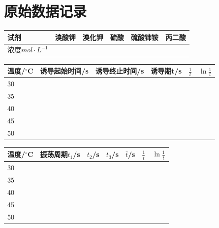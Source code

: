 \documentclass[a4paper]{article}
\begin{document}
\section{原始数据记录}
\begin{table}[!h]
	\begin{center}
		\begin{tabular}{l|l|l|l|l|l}
			\hline
			试剂&  溴酸钾&  溴化钾& 硫酸 & 硫酸铈铵 & 丙二酸\\
			\hline
			浓度$mol\cdot L^{-1}$&  &  &  &  &\\
			\hline
		 \end{tabular}
	\end{center}
\end{table}
\begin{table}[!h]
	\begin{center}
		\begin{tabular}{l|l|l|l|l|l}
			\hline
			温度/$^\circ$C&  诱导起始时间/s&  诱导终止时间/s& 诱导期t/s & $\frac{1}{t}$ & $\ln{\frac{1}{t}}$\\
			\hline
			30&  &  &  &  &\\
			\hline
			35&  &  &  &  &\\
			\hline
			40&  &  &  &  &\\
			\hline
			45&  &  &  &  &\\
			\hline
			50&  &  &  &  &\\
			\hline
		 \end{tabular}
	\end{center}
\end{table}
\begin{table}[!h]
	\begin{center}
		\begin{tabular}{l|l|l|l|l|l|l}
			\hline
			温度/$^\circ$C&  振荡周期$t_{1}$/s & $t_{2}$/s & $t_{3}$/s & $\bar{t}$/s & $\frac{1}{\bar{t}}$ & $\ln{\frac{1}{\bar{t}}}$\\
			\hline
			30&  &  &  &  &  &\\
			\hline
			35&  &  &  &  &  &\\
			\hline
			40&  &  &  &  &  &\\
			\hline
			45&  &  &  &  &  &\\
			\hline
			50&  &  &  &  &  &\\
			\hline
		 \end{tabular}
	\end{center}
\end{table}



\end{document}

